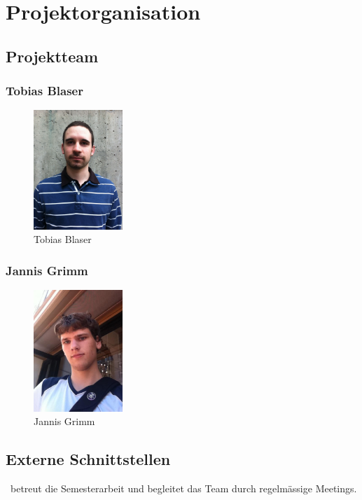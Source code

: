 \chapter{Projektorganisation}

\section{Projektteam}
\subsection*{Tobias Blaser}
\begin{figure}[H]
	\includegraphics[width=0.3\textwidth]{../projektplan/img/tobias.jpg}
	\centering
	\caption{Tobias Blaser}
	\label{fig:tobias}
\end{figure}

\subsection*{Jannis Grimm}
\begin{figure}[H]
	\includegraphics[width=0.3\textwidth]{../projektplan/img/jannis.jpg}
	\centering
	\caption{Jannis Grimm}
	\label{fig:jannis}
\end{figure}

\section{Externe Schnittstellen}
\teacher\ betreut die Semesterarbeit und begleitet das Team durch regelmässige Meetings.

